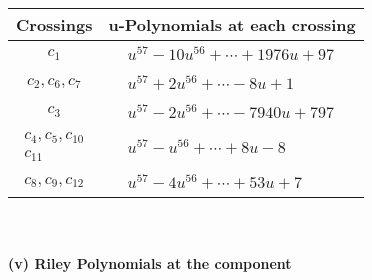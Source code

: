 \documentclass[1p]{elsarticle_modified}
\theoremstyle{definition}
\begin{document}
\begin{tabular}{m{50pt}|m{274pt}}
Crossings & \hspace{64pt}u-Polynomials at each crossing \\
\hline $$\begin{aligned}c_{1}\end{aligned}$$&$\begin{aligned}
&u^{57}-10 u^{56}+\cdots+1976 u+97
\end{aligned}$\\
\hline $$\begin{aligned}c_{2},c_{6},c_{7}\end{aligned}$$&$\begin{aligned}
&u^{57}+2 u^{56}+\cdots-8 u+1
\end{aligned}$\\
\hline $$\begin{aligned}c_{3}\end{aligned}$$&$\begin{aligned}
&u^{57}-2 u^{56}+\cdots-7940 u+797
\end{aligned}$\\
\hline $$\begin{aligned}c_{4},c_{5},c_{10}\\c_{11}\end{aligned}$$&$\begin{aligned}
&u^{57}- u^{56}+\cdots+8 u-8
\end{aligned}$\\
\hline $$\begin{aligned}c_{8},c_{9},c_{12}\end{aligned}$$&$\begin{aligned}
&u^{57}-4 u^{56}+\cdots+53 u+7
\end{aligned}$\\
\hline
\end{tabular}\\~\\
\newpage\renewcommand{\arraystretch}{1}
\flushleft \textbf{(v) Riley Polynomials at the component}\newline \\
\end{document}
